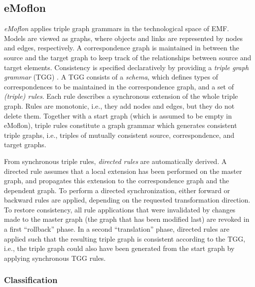 \subsection{eMoflon}
\label{sec:eMoflon}

\emph{eMoflon} \cite{Leblebici2014a} applies triple graph grammars in the technological space of EMF.
Models are viewed as graphs, where objects and links are represented by nodes and edges, respectively.
A correspondence graph is maintained in between the source and the target graph to keep track of the relationships between source and target elements.
Consistency is specified declaratively by providing a \emph{triple graph grammar} (TGG) \cite{Schurr1994}.
A TGG consists of a \emph{schema}, which defines types of correspondences to be maintained in the correspondence graph, and a set of \emph{(triple) rules}. Each rule describes a synchronous extension of the whole triple graph. Rules are monotonic, i.e., they add nodes and edges, but they do not delete them. Together with a start graph (which is assumed to be empty in eMoflon), triple rules constitute a graph grammar which generates consistent triple graphs, i.e., triples of mutually consistent source, correspondence, and target graphs.

From synchronous triple rules, \emph{directed rules} are automatically derived.
A directed rule assumes that a local extension has been performed on the master graph, and propagates this extension to the correspondence graph and the dependent graph.
To perform a directed synchronization, either forward or backward rules are applied, depending on the requested transformation direction.
To restore consistency, all rule applications that were invalidated by changes made to the master graph (the graph that has been modified last) are revoked in a first ``rollback'' phase.
In a second ``translation'' phase, directed rules are applied such that the resulting triple graph is consistent according to the TGG, i.e., the triple graph could also have been generated from the start graph by applying synchronous TGG rules.   

\subsubsection{Classification}
\label{sec:ClassificationEMoflon}

